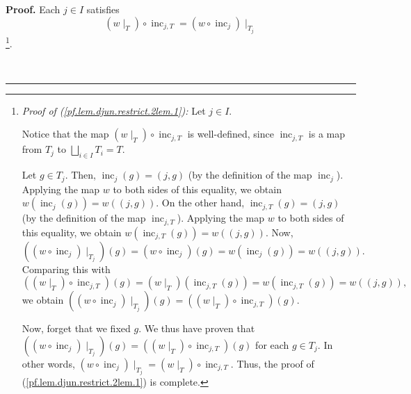\documentclass[numbers=enddot,12pt,final,onecolumn,notitlepage,abstracton]{scrartcl}
\theoremstyle{definition}
\newenvironment{proof}[1][Proof]{\noindent\textbf{#1.} }{\ \rule{0.5em}{0.5em}}
\newenvironment{verlong}{}{}
\begin{document}
\begin{verlong}
\begin{footnotesize}
\begin{proof}
Each $j\in I$ satisfies%
\begin{equation}
\left(  w\mid_{T}\right)  \circ\operatorname*{inc}\nolimits_{j,T}=\left(
w\circ\operatorname*{inc}\nolimits_{j}\right)  \mid_{T_{j}}
\label{pf.lem.djun.restrict.2lem.1}%
\end{equation}
\footnote{\textit{Proof of (\ref{pf.lem.djun.restrict.2lem.1}):} Let $j\in I$.
\par
Notice that the map $\left(  w\mid_{T}\right)  \circ\operatorname*{inc}%
\nolimits_{j,T}$ is well-defined, since $\operatorname*{inc}\nolimits_{j,T}$
is a map from $T_{j}$ to $\bigsqcup_{i\in I}T_{i}=T$.
\par
Let $g\in T_{j}$. Then, $\operatorname*{inc}\nolimits_{j}\left(  g\right)
=\left(  j,g\right)  $ (by the definition of the map $\operatorname*{inc}%
\nolimits_{j}$). Applying the map $w$ to both sides of this equality, we
obtain $w \left(  \operatorname{inc}_{j} \left(  g\right)  \right)  = w
\left(  \left(  j, g\right)  \right)  $. On the other hand,
$\operatorname*{inc}\nolimits_{j,T}\left(  g\right)  =\left(  j,g\right)  $
(by the definition of the map $\operatorname*{inc}\nolimits_{j,T}$). Applying
the map $w$ to both sides of this equality, we obtain $w \left(
\operatorname{inc}_{j,T} \left(  g\right)  \right)  = w \left(  \left(  j,
g\right)  \right)  $. Now,
\[
\left(  \left(  w\circ\operatorname*{inc}\nolimits_{j}\right)  \mid_{T_{j}%
}\right)  \left(  g\right)  =\left(  w\circ\operatorname*{inc}\nolimits_{j}%
\right)  \left(  g\right)  =w\left(  \operatorname*{inc}\nolimits_{j}\left(
g\right)  \right)  =w\left(  \left(  j,g\right)  \right)  .
\]
Comparing this with%
\[
\left(  \left(  w\mid_{T}\right)  \circ\operatorname*{inc}\nolimits_{j,T}%
\right)  \left(  g\right)  =\left(  w\mid_{T}\right)  \left(
\operatorname*{inc}\nolimits_{j,T}\left(  g\right)  \right)  =w\left(
\operatorname*{inc}\nolimits_{j,T}\left(  g\right)  \right)  =w\left(  \left(
j,g\right)  \right)  ,
\]
we obtain $\left(  \left(  w\circ\operatorname*{inc}\nolimits_{j}\right)
\mid_{T_{j}}\right)  \left(  g\right)  =\left(  \left(  w\mid_{T}\right)
\circ\operatorname*{inc}\nolimits_{j,T}\right)  \left(  g\right)  $.
\par
Now, forget that we fixed $g$. We thus have proven that $\left(  \left(
w\circ\operatorname*{inc}\nolimits_{j}\right)  \mid_{T_{j}}\right)  \left(
g\right)  =\left(  \left(  w\mid_{T}\right)  \circ\operatorname*{inc}%
\nolimits_{j,T}\right)  \left(  g\right)  $ for each $g\in T_{j}$. In other
words, $\left(  w\circ\operatorname*{inc}\nolimits_{j}\right)  \mid_{T_{j}%
}=\left(  w\mid_{T}\right)  \circ\operatorname*{inc}\nolimits_{j,T}$. Thus,
the proof of (\ref{pf.lem.djun.restrict.2lem.1}) is complete.}.


\end{proof}
\end{footnotesize}
\end{verlong}
\end{document}
